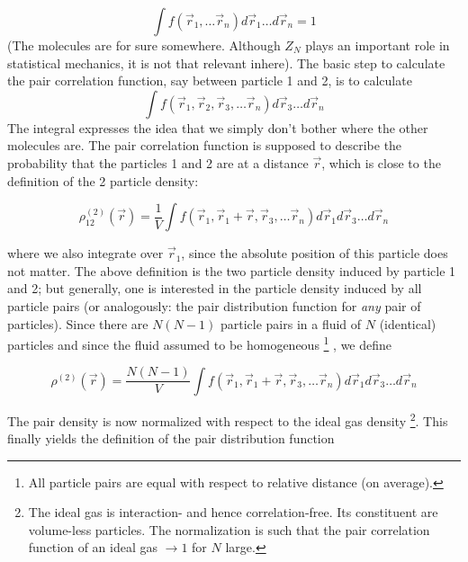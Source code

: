 \documentclass[11pt,a4paper]{article}
\begin{document}
\begin{equation}
\int f(\vec r_1, \dots \vec r_n)d \vec r_1 \dots d\vec r_n = 1
\end{equation}
(The molecules are for sure somewhere. Although $Z_N$ plays an important role in statistical mechanics, it is not that relevant inhere).\newline
The basic step to calculate the pair correlation function, say between particle 1 and 2, is to calculate
\begin{equation}
\int f(\vec r_1, \vec r_2,\vec r_3,\dots \vec r_n)d \vec r_3 \dots d\vec r_n
\end{equation}
The integral expresses the idea that we simply don't bother where the other molecules are. \newline
The pair correlation function is supposed to describe the probability that the particles 1 and 2 are at a distance $\vec r$,
which is close to  the definition of the 2 particle density:

\begin{equation}
\rho_{12}^{(2)} (\vec r) = \frac{1}{V}
\int f(\vec r_1, \vec r_1 + \vec r,\vec r_3,\dots \vec r_n) d\vec r_1 d\vec r_3 \dots d\vec r_n
\end{equation}

where we also integrate over $\vec r_1$, since the absolute position of this particle does not matter. The above definition is the two particle
density induced by particle 1 and 2; but generally, one is interested in the particle density induced by all particle pairs (or analogously: the
pair distribution function for \textit{any} pair of particles). Since there are $N(N-1)$ particle pairs in a fluid of $N$ (identical) particles
and since the fluid assumed to be homogeneous \footnote{All particle pairs are equal with respect to relative distance (on average).}
, we define

\begin{equation}
\rho^{(2)} (\vec r) = \frac{N(N-1)}{V} \int f(\vec r_1, \vec r_1 + \vec r,\vec r_3,\dots \vec r_n) d\vec r_1 d\vec r_3 \dots d\vec r_n
\end{equation}

The pair density is now normalized with respect to the ideal gas density
\footnote{The ideal gas is interaction- and hence correlation-free. Its constituent are volume-less particles. The normalization
is such that the pair correlation function of an ideal gas $\rightarrow 1$ for $N$ large.}.
This finally yields the definition of the pair distribution function
\end{document}
